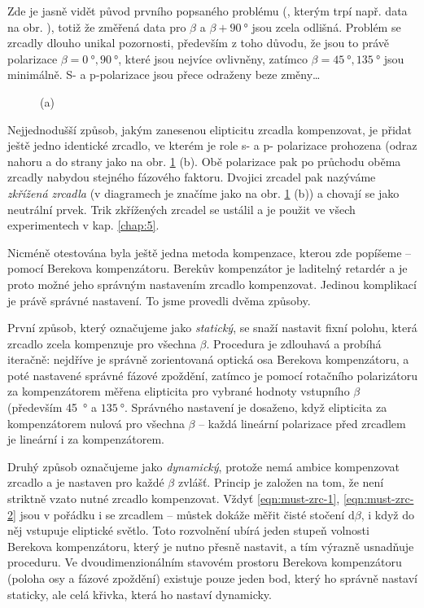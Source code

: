 Zde je jasně vidět původ prvního popsaného problému (, kterým trpí např. data na obr. ), totiž že změřená data pro $\beta$ a $\beta+\SI{90}{\degree}$ jsou zcela odlišná.
Problém se zrcadly dlouho unikal pozornosti, především z toho důvodu, že jsou to právě polarizace $\beta=\SI{0}{\degree}, \SI{90}{\degree}$, které jsou nejvíce ovlivněny, zatímco $\beta=\SI{45}{\degree}, \SI{135}{\degree}$ jsou minimálně.
S- a p-polarizace jsou přece odraženy beze změny\ldots

\begin{figure}[htbp]
    \centering
    \caption{(a) }
    \label{fig:mustek-zrcadlo-data}
\end{figure}

Nejjednodušší způsob, jakým zanesenou elipticitu zrcadla kompenzovat, je přidat ještě jedno identické zrcadlo, ve kterém je role s- a p- polarizace prohozena (odraz nahoru a do strany jako na obr. \ref{fig:mustek-zrcadlo-data} (b).
Obě polarizace pak po průchodu oběma zrcadly nabydou stejného fázového faktoru.
Dvojici zrcadel pak nazýváme \emph{zkřížená zrcadla} (v diagramech je značíme jako na obr. \ref{fig:mustek-zrcadlo-data} (b)) a chovají se jako neutrální prvek.
Trik zkřížených zrcadel se ustálil a je použit ve všech experimentech v kap. \ref{chap:5}.

Nicméně otestována byla ještě jedna metoda kompenzace, kterou zde popíšeme -- pomocí Berekova kompenzátoru.
Berekův kompenzátor je laditelný retardér a je proto možné jeho správným nastavením zrcadlo kompenzovat.
Jedinou komplikací je právě správné nastavení.
To jsme provedli dvěma způsoby.

První způsob, který označujeme jako \emph{statický}, se snaží nastavit fixní polohu, která zrcadlo zcela kompenzuje pro všechna $\beta$.
Procedura je zdlouhavá a probíhá iteračně: nejdříve je správně zorientovaná optická osa Berekova kompenzátoru, a poté nastavené správné fázové zpoždění, zatímco je pomocí rotačního polarizátoru za kompenzátorem měřena elipticita pro vybrané hodnoty vstupního $\beta$ (především \SI{45}{\degree} a $\SI{135}{\degree}$.
Správného nastavení je dosaženo, když elipticita za kompenzátorem nulová pro všechna $\beta$ -- každá lineární polarizace před zrcadlem je lineární i za kompenzátorem.

Druhý způsob označujeme jako \emph{dynamický}, protože nemá ambice kompenzovat zrcadlo a je nastaven pro každé $\beta$ zvlášť.
Princip je založen na tom, že není striktně vzato nutné zrcadlo kompenzovat. Vždyť \eqref{eqn:must-zrc-1}, \eqref{eqn:must-zrc-2} jsou v pořádku i se zrcadlem -- můstek dokáže měřit čisté stočení $\textrm{d}\beta$, i když do něj vstupuje eliptické světlo.
Toto rozvolnění ubírá jeden stupeň volnosti Berekova kompenzátoru, který je nutno přesně nastavit, a tím výrazně usnadňuje proceduru.
Ve dvoudimenzionálním stavovém prostoru Berekova kompenzátoru (poloha osy a fázové zpoždění) existuje pouze jeden bod, který ho správně nastaví staticky, ale celá křivka, která ho nastaví dynamicky.

